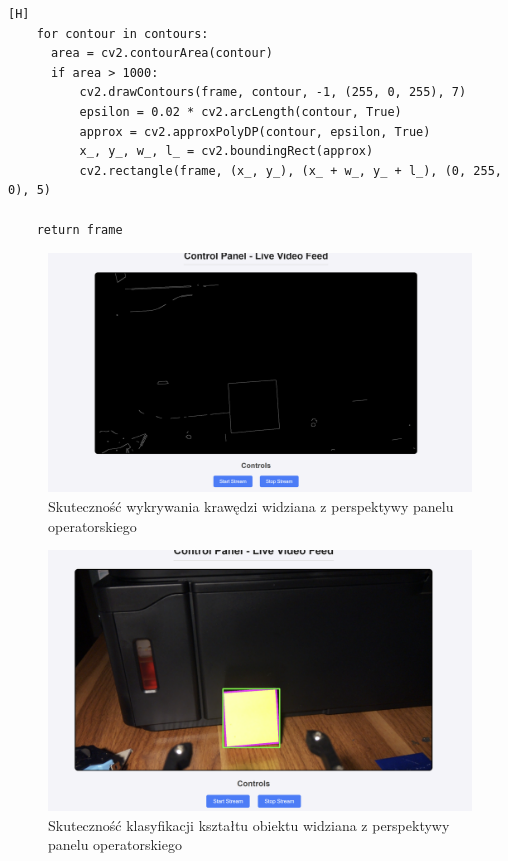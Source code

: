 \begin{lstlisting}[caption=Kod detekcji i klasyfikacji kształtów kwadratowych, label=fig:square_detection, captionpos=b][H]
    for contour in contours:
      area = cv2.contourArea(contour)
      if area > 1000:
          cv2.drawContours(frame, contour, -1, (255, 0, 255), 7)
          epsilon = 0.02 * cv2.arcLength(contour, True)
          approx = cv2.approxPolyDP(contour, epsilon, True)
          x_, y_, w_, l_ = cv2.boundingRect(approx)
          cv2.rectangle(frame, (x_, y_), (x_ + w_, y_ + l_), (0, 255, 0), 5)

    return frame
\end{lstlisting}


\begin{figure}[H]
  \centering
  \includegraphics[width=1.0\textwidth]{./graf/krawedzie.png}
  \caption{Skuteczność wykrywania krawędzi widziana z perspektywy panelu operatorskiego}
  \label{img:krawedzie}
\end{figure}

\begin{figure}[H]
  \centering
  \includegraphics[width=1.0\textwidth]{./graf/klasyfikacja-ksztaltu.png}
  \caption{Skuteczność klasyfikacji kształtu obiektu widziana z perspektywy panelu operatorskiego}
  \label{img:klas-obj}
\end{figure}

